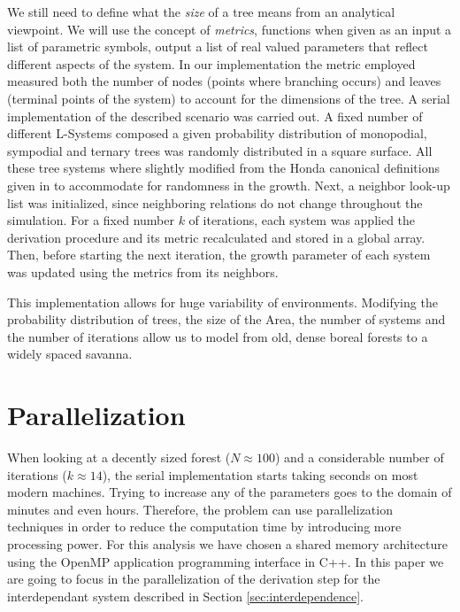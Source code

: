\documentclass[letterpaper,twoside,11pt]{article}
\begin{document}
\begin{multicols}{2}
 We still need to define what the \emph{size} of a tree means from an analytical viewpoint. We will use the concept of \emph{metrics}, functions when given as an input a list of parametric symbols, output a list of real valued parameters that reflect different aspects of the system. In our implementation the metric employed measured both the number of nodes (points where branching occurs) and leaves (terminal points of the system) to account for the dimensions of the tree.
\vfill
\columnbreak
 A serial implementation of the described scenario was carried out\footnotemark. A fixed number of different L-Systems composed a given probability distribution of monopodial, sympodial and ternary trees was randomly distributed in a square surface. All these tree systems where slightly modified from the Honda canonical definitions given in \cite{Prusinkiewicz:1996:ABP:235579} to accommodate for randomness in the growth. Next, a neighbor look-up list was initialized, since neighboring relations do not change throughout the simulation. For a fixed number $k$ of iterations, each system was applied the derivation procedure and its metric recalculated and stored in a global array. Then, before starting the next iteration, the growth parameter of each system was updated using the metrics from its neighbors.

 This implementation allows for huge variability of environments. Modifying the probability distribution of trees, the size of the Area, the number of systems and the number of iterations allow us to model from old, dense boreal forests to a widely spaced savanna.



\section{Parallelization} %
\label{sec:parallelization}

When looking at a decently sized forest ($N \approx 100$) and a considerable number of iterations ($k \approx 14$), the serial implementation starts taking seconds on most modern machines. Trying to increase any of the parameters goes to the domain of minutes and even hours. Therefore, the problem can use parallelization techniques in order to reduce the computation time by introducing more processing power. For this analysis we have chosen a shared memory architecture using the OpenMP application programming interface in C++. In this paper we are going to focus in the parallelization of the derivation step for the interdependant system described in Section \ref{sec:interdependence}. \phantom{This is}


\end{multicols}
\end{document}
